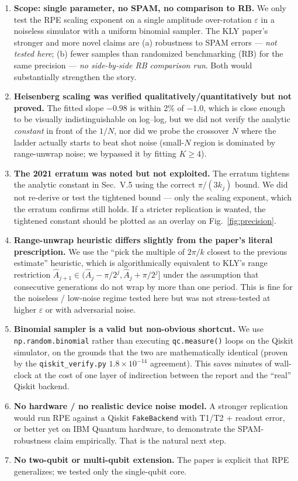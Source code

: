 \documentclass[11pt]{article}
\begin{document}
\begin{enumerate}
\item \textbf{Scope: single parameter, no SPAM, no comparison to RB.}
  We only test the RPE scaling exponent on a single amplitude
  over-rotation $\varepsilon$ in a noiseless simulator with a uniform
  binomial sampler. The KLY paper's stronger and more novel claims are
  (a) robustness to SPAM errors --- \emph{not tested here}; (b) fewer
  samples than randomized benchmarking (RB) for the same precision ---
  \emph{no side-by-side RB comparison run}. Both would substantially
  strengthen the story.
\item \textbf{Heisenberg scaling was verified qualitatively/quantitatively
  but not proved.} The fitted slope $-0.98$ is within 2\% of $-1.0$,
  which is close enough to be visually indistinguishable on log--log,
  but we did not verify the analytic \emph{constant} in front of the
  $1/N$, nor did we probe the crossover $N$ where the ladder actually
  starts to beat shot noise (small-$N$ region is dominated by
  range-unwrap noise; we bypassed it by fitting $K \ge 4$).
\item \textbf{The 2021 erratum was noted but not exploited.} The erratum
  tightens the analytic constant in Sec.~V.5 using the correct
  $\pi/(3k_j)$ bound. We did not re-derive or test the tightened bound
  --- only the scaling exponent, which the erratum confirms still holds.
  If a stricter replication is wanted, the tightened constant should be
  plotted as an overlay on Fig.~\ref{fig:precision}.
\item \textbf{Range-unwrap heuristic differs slightly from the paper's
  literal prescription.} We use the ``pick the multiple of $2\pi/k$
  closest to the previous estimate'' heuristic, which is algorithmically
  equivalent to KLY's range restriction
  $\hat A_{j+1} \in (\hat A_j - \pi/2^j, \hat A_j + \pi/2^j]$ under the
  assumption that consecutive generations do not wrap by more than one
  period. This is fine for the noiseless / low-noise regime tested here
  but was not stress-tested at higher $\varepsilon$ or with adversarial
  noise.
\item \textbf{Binomial sampler is a valid but non-obvious shortcut.} We
  use \texttt{np.random.binomial} rather than executing
  \texttt{qc.measure()} loops on the Qiskit simulator, on the grounds
  that the two are mathematically identical (proven by the
  \texttt{qiskit\_verify.py} $1.8\times 10^{-14}$ agreement). This saves
  minutes of wall-clock at the cost of one layer of indirection between
  the report and the ``real'' Qiskit backend.
\item \textbf{No hardware / no realistic device noise model.} A stronger
  replication would run RPE against a Qiskit \texttt{FakeBackend} with
  T1/T2 + readout error, or better yet on IBM Quantum hardware, to
  demonstrate the SPAM-robustness claim empirically. That is the
  natural next step.
\item \textbf{No two-qubit or multi-qubit extension.} The paper is
  explicit that RPE generalizes; we tested only the single-qubit core.
\end{enumerate}
\end{document}
